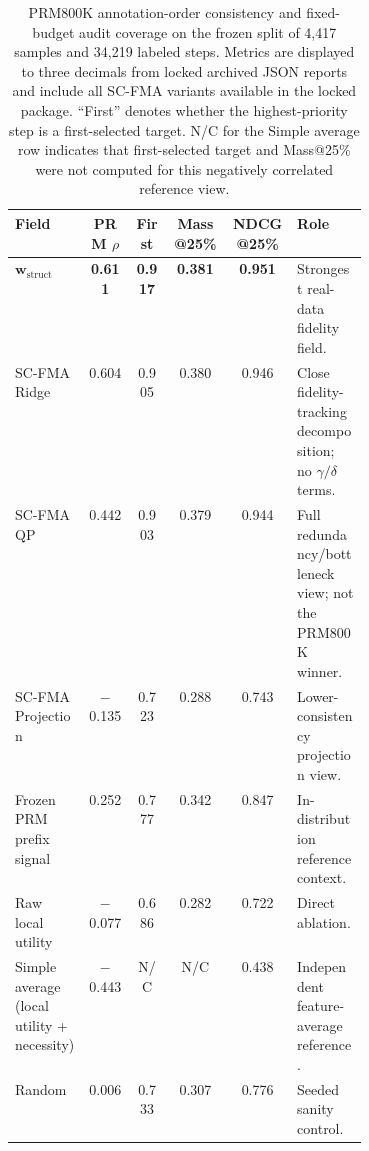 \documentclass[pdflatex,sn-mathphys-num,iicol]{sn-jnl}
\newcommand{\wstruct}{\ensuremath{\mathbf{w}_{\mathrm{struct}}}}
\begin{document}
\begin{table}[ht]
\caption{PRM800K annotation-order consistency and fixed-budget audit coverage on the frozen split of 4,417 samples and 34,219 labeled steps. Metrics are displayed to three decimals from locked archived JSON reports and include all SC-FMA variants available in the locked package. ``First'' denotes whether the highest-priority step is a first-selected target. N/C for the Simple average row indicates that first-selected target and Mass@25\% were not computed for this negatively correlated reference view.}
\label{tab:prm800k-audit}
\centering
\scriptsize
\renewcommand{\arraystretch}{1.08}
\begin{tabular}{Z{0.21\linewidth}ccccZ{0.20\linewidth}}
\toprule
\textbf{Field} & \textbf{PRM $\rho$} & \textbf{First} & \textbf{Mass@25\%} & \textbf{NDCG@25\%} & \textbf{Role} \\
\midrule
\wstruct{} & \textbf{0.611} & \textbf{0.917} & \textbf{0.381} & \textbf{0.951} & Strongest real-data fidelity field. \\
SC-FMA Ridge & 0.604 & 0.905 & 0.380 & 0.946 & Close fidelity-tracking decomposition; no $\gamma/\delta$ terms. \\
SC-FMA QP & 0.442 & 0.903 & 0.379 & 0.944 & Full redundancy/bottleneck view; not the PRM800K winner. \\
SC-FMA Projection & $-$0.135 & 0.723 & 0.288 & 0.743 & Lower-consistency projection view. \\
Frozen PRM prefix signal & 0.252 & 0.777 & 0.342 & 0.847 & In-distribution reference context. \\
Raw local utility & $-$0.077 & 0.686 & 0.282 & 0.722 & Direct ablation. \\
Simple average (local utility + necessity) & $-$0.443 & N/C & N/C & 0.438 & Independent feature-average reference. \\
Random & 0.006 & 0.733 & 0.307 & 0.776 & Seeded sanity control. \\
\bottomrule
\end{tabular}
\end{table}
\end{document}
